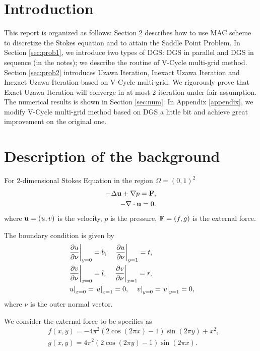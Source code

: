 \documentclass[english]{pkupaper}
\title{\titlemark}
\author{1500010611 汪祎非}
\date{}
\newenvironment{eqt}{\begin{equation}\begin{aligned}}{\end{aligned}\end{equation}}
\begin{document}
\maketitle

\section{Introduction}
This report is organized as follows: Section \ref{sec:dotb} describes how to use MAC scheme to discretize the Stokes equation and to attain the Saddle Point Problem. In Section \ref{sec:prob1}, we introduce two types of DGS: DGS in parallel \cite{mmfts} and DGS in sequence (in the notes); we describe the routine of V-Cycle multi-grid method. Section \ref{sec:prob2} introduces Uzawa Iteration, Inexact Uzawa Iteration and Inexact Uzawa Iteration based on V-Cycle multi-grid. We rigorously prove that Exact Uzawa Iteration will converge in at most 2 iteration under fair assumption. The numerical results is shown in Section \ref{sec:num}. In Appendix \ref{appendix}, we modify V-Cycle multi-grid method based on DGS a little bit and achieve great improvement on the original one. 

\section{Description of the background}
\label{sec:dotb}
For 2-dimensional Stokes Equation in the region $\Omega=(0,1)^2$
\begin{equation}
\label{stokes}
\begin{aligned}
-\Delta \mathbf{u} +\nabla p =\mathbf{F},\\
-\nabla \cdot \mathbf{u} = 0.
\end{aligned}
\end{equation}
where $\mathbf{u}=(u,v)$ is the velocity, $p$ is the pressure, $\mathbf{F}=(f,g)$ is the external force.

The boundary condition is given by
\begin{eqt}
&\left.\frac{\p u}{\p \nu}\right|_{y=0}=b, \quad \left.\frac{\p u}{\p \nu}\right|_{y=1}=t,\\
&\left.\frac{\p v}{\p \nu}\right|_{x=0}=l, \quad \left.\frac{\p v}{\p \nu}\right|_{x=1}=r,\\
&\left.u\right|_{x=0}=\left.u\right|_{x=1}=0, \quad \left.v\right|_{y=0}=\left.v\right|_{y=1}=0,
\end{eqt}
where $\nu$ is the outer normal vector.

We consider the external force to be specifies as 
\begin{equation}
\begin{aligned}
&f(x,y)=-4\pi^2(2\cos(2\pi x)-1)\sin(2\pi y)+x^2,\\
&g(x,y)=4\pi^2(2\cos(2\pi y)-1)\sin(2\pi x).
\end{aligned}
\end{equation}
\end{document}
